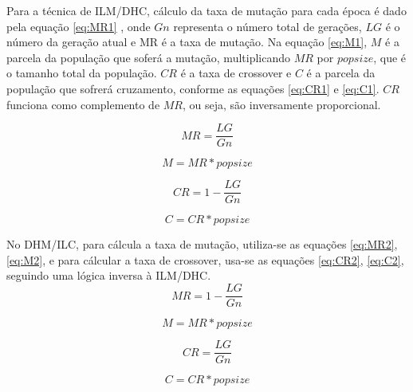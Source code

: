 \documentclass[conference]{IEEEtran}
\begin{document}
Para a técnica de ILM/DHC, cálculo da taxa de mutação para cada época é dado pela equação \ref{eq:MR1} , onde $Gn$ representa o número total de gerações, $LG$ é o número da geração atual e MR é a taxa de mutação. Na equação \ref{eq:M1}, $M$ é a parcela da população que soferá a mutação, multiplicando $MR$ por $popsize$, que é o tamanho total da população.
$CR$ é a taxa de crossover e $C$ é a parcela da população que sofrerá cruzamento, conforme as equações \ref{eq:CR1} e \ref{eq:C1}. $CR$ funciona como complemento de $MR$, ou seja, são inversamente proporcional.

\begin{equation}
\label{eq:MR1}
    MR = \frac{LG}{Gn}
\end{equation}

\begin{equation}
\label{eq:M1}
    M = MR * popsize    
\end{equation}

\begin{equation}
\label{eq:CR1}
    CR = 1 - \frac{LG}{Gn}
\end{equation}

\begin{equation}
\label{eq:C1}
    C = CR * popsize    
\end{equation}

No DHM/ILC, para cálcula a taxa de mutação, utiliza-se as equações \ref{eq:MR2}, \ref{eq:M2}, e para cálcular a taxa de crossover, usa-se as equações \ref{eq:CR2}, \ref{eq:C2}, seguindo uma lógica inversa à ILM/DHC.
\begin{equation}
\label{eq:MR2}
    MR = 1 - \frac{LG}{Gn}
\end{equation}

\begin{equation}
\label{eq:M2}
    M = MR * popsize    
\end{equation}

\begin{equation}
\label{eq:CR2}
    CR = \frac{LG}{Gn}
\end{equation}

\begin{equation}
\label{eq:C2}
    C = CR * popsize    
\end{equation}
\end{document}
